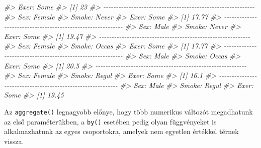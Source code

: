 \documentclass[
]{book}
\newenvironment{Shaded}{\begin{snugshade}}{\end{snugshade}}
\newcommand{\CommentTok}[1]{\textcolor[rgb]{0.56,0.35,0.01}{\textit{#1}}}
\begin{document}
\begin{Shaded}
\begin{Highlighting}[]
\CommentTok{\#\textgreater{} Exer: Some}
\CommentTok{\#\textgreater{} [1] 23}
\CommentTok{\#\textgreater{} {-}{-}{-}{-}{-}{-}{-}{-}{-}{-}{-}{-}{-}{-}{-}{-}{-}{-}{-}{-}{-}{-}{-}{-}{-}{-}{-}{-}{-}{-}{-}{-}{-}{-}{-}{-}{-}{-}{-}{-}{-}{-}{-}{-}{-}{-}{-}{-}{-}{-}{-}{-}{-}{-}{-}{-}{-}{-}{-}{-} }
\CommentTok{\#\textgreater{} Sex: Female}
\CommentTok{\#\textgreater{} Smoke: Never}
\CommentTok{\#\textgreater{} Exer: Some}
\CommentTok{\#\textgreater{} [1] 17.77}
\CommentTok{\#\textgreater{} {-}{-}{-}{-}{-}{-}{-}{-}{-}{-}{-}{-}{-}{-}{-}{-}{-}{-}{-}{-}{-}{-}{-}{-}{-}{-}{-}{-}{-}{-}{-}{-}{-}{-}{-}{-}{-}{-}{-}{-}{-}{-}{-}{-}{-}{-}{-}{-}{-}{-}{-}{-}{-}{-}{-}{-}{-}{-}{-}{-} }
\CommentTok{\#\textgreater{} Sex: Male}
\CommentTok{\#\textgreater{} Smoke: Never}
\CommentTok{\#\textgreater{} Exer: Some}
\CommentTok{\#\textgreater{} [1] 19.47}
\CommentTok{\#\textgreater{} {-}{-}{-}{-}{-}{-}{-}{-}{-}{-}{-}{-}{-}{-}{-}{-}{-}{-}{-}{-}{-}{-}{-}{-}{-}{-}{-}{-}{-}{-}{-}{-}{-}{-}{-}{-}{-}{-}{-}{-}{-}{-}{-}{-}{-}{-}{-}{-}{-}{-}{-}{-}{-}{-}{-}{-}{-}{-}{-}{-} }
\CommentTok{\#\textgreater{} Sex: Female}
\CommentTok{\#\textgreater{} Smoke: Occas}
\CommentTok{\#\textgreater{} Exer: Some}
\CommentTok{\#\textgreater{} [1] 17.77}
\CommentTok{\#\textgreater{} {-}{-}{-}{-}{-}{-}{-}{-}{-}{-}{-}{-}{-}{-}{-}{-}{-}{-}{-}{-}{-}{-}{-}{-}{-}{-}{-}{-}{-}{-}{-}{-}{-}{-}{-}{-}{-}{-}{-}{-}{-}{-}{-}{-}{-}{-}{-}{-}{-}{-}{-}{-}{-}{-}{-}{-}{-}{-}{-}{-} }
\CommentTok{\#\textgreater{} Sex: Male}
\CommentTok{\#\textgreater{} Smoke: Occas}
\CommentTok{\#\textgreater{} Exer: Some}
\CommentTok{\#\textgreater{} [1] 20.5}
\CommentTok{\#\textgreater{} {-}{-}{-}{-}{-}{-}{-}{-}{-}{-}{-}{-}{-}{-}{-}{-}{-}{-}{-}{-}{-}{-}{-}{-}{-}{-}{-}{-}{-}{-}{-}{-}{-}{-}{-}{-}{-}{-}{-}{-}{-}{-}{-}{-}{-}{-}{-}{-}{-}{-}{-}{-}{-}{-}{-}{-}{-}{-}{-}{-} }
\CommentTok{\#\textgreater{} Sex: Female}
\CommentTok{\#\textgreater{} Smoke: Regul}
\CommentTok{\#\textgreater{} Exer: Some}
\CommentTok{\#\textgreater{} [1] 16.1}
\CommentTok{\#\textgreater{} {-}{-}{-}{-}{-}{-}{-}{-}{-}{-}{-}{-}{-}{-}{-}{-}{-}{-}{-}{-}{-}{-}{-}{-}{-}{-}{-}{-}{-}{-}{-}{-}{-}{-}{-}{-}{-}{-}{-}{-}{-}{-}{-}{-}{-}{-}{-}{-}{-}{-}{-}{-}{-}{-}{-}{-}{-}{-}{-}{-} }
\CommentTok{\#\textgreater{} Sex: Male}
\CommentTok{\#\textgreater{} Smoke: Regul}
\CommentTok{\#\textgreater{} Exer: Some}
\CommentTok{\#\textgreater{} [1] 19.45}
\end{Highlighting}
\end{Shaded}

Az \texttt{aggregate()} legnagyobb előnye, hogy több numerikus változót megadhatunk az első paraméterükben, a \texttt{by()} esetében pedig olyan függvényeket is alkalmazhatunk az egyes csoportokra, amelyek nem egyetlen értékkel térnek vissza.
\end{document}
